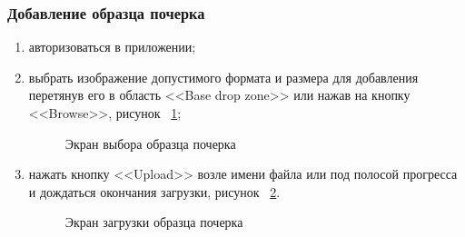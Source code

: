 \subsubsection{Добавление образца почерка}
\label{sec:manpage:client_man:add_sample}
\begin{enumerate}
    \item авторизоваться в приложении;
    \item выбрать изображение допустимого формата и размера для добавления перетянув его в область <<Base drop zone>> или нажав на кнопку <<Browse>>, рисунок ~\ref{fig:manpage:client_man:add_sample};
        \begin{figure}[ht]
            \centering
            \caption{Экран выбора образца почерка}
            \label{fig:manpage:client_man:add_sample}
        \end{figure}
    \item нажать кнопку <<Upload>> возле имени файла или под полосой прогресса и дождаться окончания загрузки, рисунок ~\ref{fig:manpage:client_man:upload_sample}.
        \begin{figure}[ht]
            \centering
            \caption{Экран загрузки образца почерка}
            \label{fig:manpage:client_man:upload_sample}
        \end{figure}
\end{enumerate}

